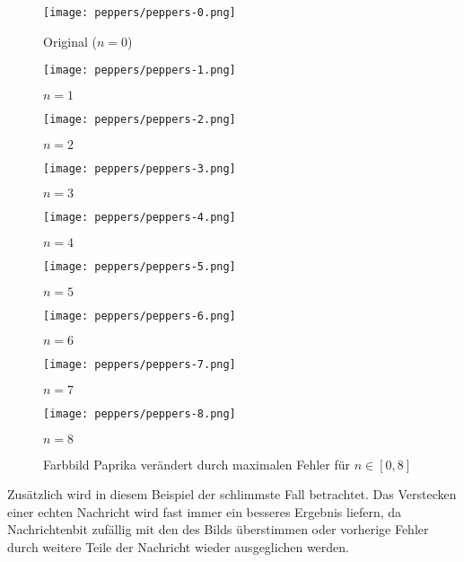 \begin{figure}[h!]
  \centering
  \begin{minipage}[t]{0.3\textwidth}
    \texttt{[image: peppers/peppers-0.png]}
    \caption*{Original ($n = 0$)}
  \end{minipage}
  \hfill
  \begin{minipage}[t]{0.3\textwidth}
    \texttt{[image: peppers/peppers-1.png]}
    \caption*{$n = 1$}
  \end{minipage}
  \hfill
  \begin{minipage}[t]{0.3\textwidth}
    \texttt{[image: peppers/peppers-2.png]}
    \caption*{$n = 2$}
  \end{minipage}%
  \vspace{0.5cm}
  \begin{minipage}[t]{0.3\textwidth}
    \texttt{[image: peppers/peppers-3.png]}
    \caption*{$n = 3$}
  \end{minipage}
  \hfill
  \begin{minipage}[t]{0.3\textwidth}
    \texttt{[image: peppers/peppers-4.png]}
    \caption*{$n = 4$}
  \end{minipage}
  \hfill
  \begin{minipage}[t]{0.3\textwidth}
    \texttt{[image: peppers/peppers-5.png]}
    \caption*{$n = 5$}
  \end{minipage}%
  \vspace{0.5cm}
  \begin{minipage}[t]{0.3\textwidth}
    \texttt{[image: peppers/peppers-6.png]}
    \caption*{$n = 6$}
  \end{minipage}
  \hfill
  \begin{minipage}[t]{0.3\textwidth}
    \texttt{[image: peppers/peppers-7.png]}
    \caption*{$n = 7$}
  \end{minipage}
  \hfill
  \begin{minipage}[t]{0.3\textwidth}
    \texttt{[image: peppers/peppers-8.png]}
    \caption*{$n = 8$}
  \end{minipage}
  \caption{Farbbild Paprika verändert durch maximalen Fehler für $n \in [0,8]$}
  \label{fig:peppers}
\end{figure}
\noindent
Zusätzlich wird in diesem Beispiel der schlimmste Fall betrachtet.
Das Verstecken einer echten Nachricht wird fast immer
ein besseres Ergebnis liefern, da Nachrichtenbit
zufällig mit den des Bilds überstimmen oder vorherige Fehler
durch weitere Teile der Nachricht wieder ausgeglichen werden.

